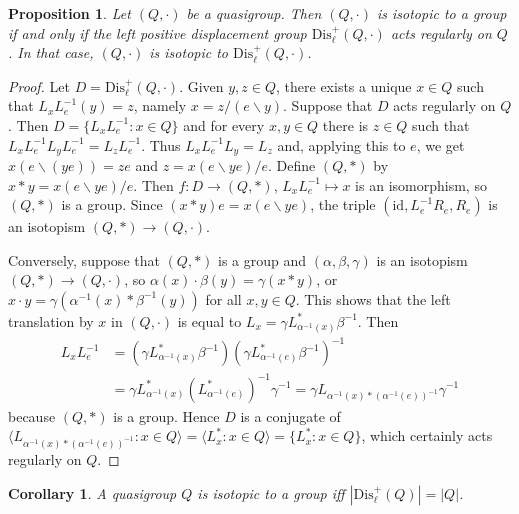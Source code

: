 \documentclass{amsart}
\def\rdiv{/}
\def\ldiv{\backslash}
\theoremstyle{plain}
\newtheorem{corollary}[theorem]{Corollary}
\newtheorem{proposition}[theorem]{Proposition}
\theoremstyle{definition}
\begin{document}
\begin{proposition}
Let $(Q,\cdot)$ be a quasigroup. Then $(Q,\cdot)$ is isotopic to a group if and only if the left positive displacement group $\mathrm{Dis}_\ell^+(Q,\cdot)$ acts regularly on $Q$. In that case, $(Q,\cdot)$ is isotopic to 
$\mathrm{Dis}_\ell^+(Q,\cdot)$.
\end{proposition}
\begin{proof}
Let $D=\mathrm{Dis}_\ell^+(Q,\cdot)$. Given $y,z\in Q$, there exists a unique $x\in Q$ such that $L_xL_e^{-1}(y)=z$, namely $x = z\rdiv (e\ldiv y)$. Suppose that $D$ acts regularly on $Q$. Then $D=\{L_xL_e^{-1}:x\in Q\}$ and for every $x,y\in Q$ there is $z\in Q$ such that $L_xL_e^{-1}L_yL_e^{-1} = L_zL_e^{-1}$. Thus $L_xL_e^{-1}L_y = L_z$ and, applying this to $e$, we get $x(e\ldiv (ye)) = ze$ and $z=x(e\ldiv ye)\rdiv e$. Define $(Q,*)$ by $x*y = x(e\ldiv ye)\rdiv e$. Then $f:D\to (Q,*)$, $L_xL_e^{-1}\mapsto x$ is an isomorphism, so $(Q,*)$ is a group. Since $(x*y)e = x(e\ldiv ye)$, the triple $(\mathrm{id},L_e^{-1}R_e,R_e)$ is an isotopism $(Q,*)\to (Q,\cdot)$.

Conversely, suppose that $(Q,*)$ is a group and $(\alpha,\beta,\gamma)$ is an isotopism $(Q,*)\to (Q,\cdot)$, so $\alpha(x)\cdot\beta(y) = \gamma(x*y)$, or $x\cdot y = \gamma(\alpha^{-1}(x)*\beta^{-1}(y))$ for all $x,y\in Q$. This shows that the left translation by $x$ in $(Q,\cdot)$ is equal to $L_x = \gamma L_{\alpha^{-1}(x)}^*\beta^{-1}$. Then
\begin{align*}
    L_xL_e^{-1} &= (\gamma L_{\alpha^{-1}(x)}^*\beta^{-1})(\gamma L_{\alpha^{-1}(e)}^*\beta^{-1})^{-1}\\
     &= \gamma L_{\alpha^{-1}(x)}^*(L_{\alpha^{-1}(e)}^*)^{-1}\gamma^{-1} = \gamma L_{\alpha^{-1}(x)*(\alpha^{-1}(e))^{-1}}\gamma^{-1}
\end{align*}
because $(Q,*)$ is a group. Hence $D$ is a conjugate of $\langle L_{\alpha^{-1}(x)*(\alpha^{-1}(e))^{-1}}:x\in Q\rangle = \langle L_x^*:x\in Q\rangle = \{L_x^*:x\in Q\}$, which certainly acts regularly on $Q$.
\end{proof}

\begin{corollary}
A quasigroup $Q$ is isotopic to a group iff $|\mathrm{Dis}_\ell^+(Q)|=|Q|$.
\end{corollary}
\end{document}
